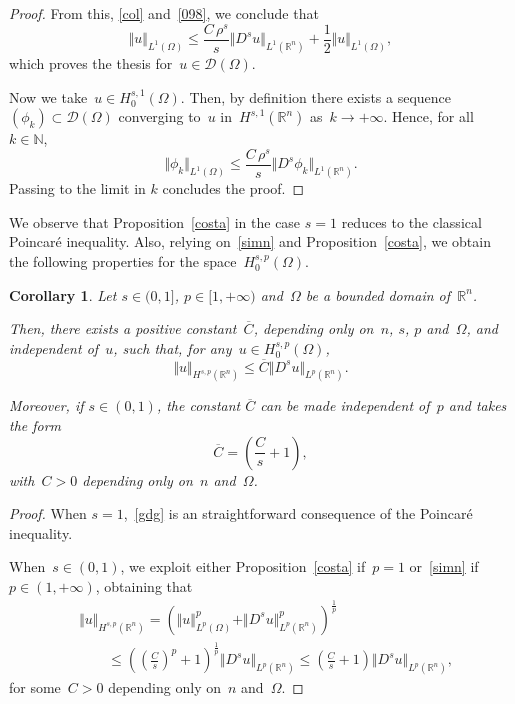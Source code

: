 \documentclass[11pt,hyp,]{nyjm}
\numberwithin{equation}{section}
\newcommand{\R}{\mathbb{R}}
\newcommand{\N}{\mathbb{N}}
\newtheorem{corollary}[theorem]{Corollary}
\theoremstyle{remark}
\renewcommand{\leq}{\leqslant}
\renewcommand{\le}{\leqslant}
\begin{document}
\begin{proof}
From this, \eqref{col} and~\eqref{098}, we conclude that
		\begin{equation}\label{sggs}
			\Vert u \Vert_{L^1(\Omega)} \leq \frac{C\, \rho^s}{s} \Vert D^s u \Vert_{L^1(\R^n)} + \frac{1}{2} \Vert u \Vert_{L^1(\Omega)},
		\end{equation}
		which proves the thesis for~$u \in \mathcal{D}(\Omega)$. 
		
{N}ow we take~$u \in H^{s,1}_0(\Omega)$. Then, by definition there exists  a sequence $(\phi_k) \subset \mathcal{D}(\Omega)$ converging to~$u$ in~$H^{s,1}(\R^n)$ as~$k\to+\infty$. Hence, for all~$k\in\N$,
\begin{equation}
\Vert \phi_k \Vert_{L^1(\Omega)} \leq \frac{C\,\rho^s}{s} \Vert D^s \phi_k \Vert_{L^1(\R^n)} .
\end{equation}
Passing to the limit in $k$ concludes the proof.
\end{proof}

We observe that Proposition~\ref{costa} in the case $s=1$ reduces to the classical Poincar\'{e} inequality.
Also, relying on~\eqref{simn} and Proposition~\ref{costa}, we obtain the following properties for the space~$H_0^{s,p}(\Omega)$.

	\begin{corollary}\label{equivalentno} Let $s \in (0,1]$, $p \in [1, +\infty)$
		and~$\Omega$ be a bounded domain of~$\R^n$. 
		
		Then, there exists a positive constant~${\overline C}$, depending only
		on~$n$, $s$, $p$ and~$\Omega$, and independent of~$u$,
		such that, for any~$u \in H_0^{s,p}(\Omega)$,
\begin{equation}\label{gdg}
 \Vert u \Vert_{H^{s,p}(\R^n)} \leq \overline C\Vert D^s u \Vert_{L^p(\R^n)} .
\end{equation}

Moreover, if $s \in (0,1)$, the constant $\overline C$ can be made independent of~$p$ and takes the form
$$ {\overline C}=\left( \frac{C}{s}+1 \right),$$
with~$C>0$ depending only on~$n$ and~$\Omega$.
\end{corollary}

\begin{proof}
{W}hen $s=1$,~\eqref{gdg} is an straightforward consequence of the Poincar\'{e} inequality. 

When~$s \in (0,1)$, we exploit
either Proposition~\ref{costa} if~$p=1$ or~\eqref{simn} if~$p \in (1, +\infty) $, obtaining that
\begin{equation*}\begin{split}&
\Vert u \Vert _{H^{s,p}(\R^n)}= \left(\Vert u \Vert _{L^p(\Omega)}^p  +\Vert D^s u \Vert _{L^p(\R^n)}^p \right)^{\frac1p}\\&\qquad\leq \left(  \left(\frac{C}{s}\right)^p+1 \right)^{\frac1p} \Vert D^s u \Vert _{L^p(\R^n)}
\le \left( \frac{C}{s}+1 \right)\Vert D^s u \Vert _{L^p(\R^n)},\end{split}
\end{equation*}
for some~$C>0$ depending only on~$n$ and~$\Omega$.
\end{proof}
\end{document}
